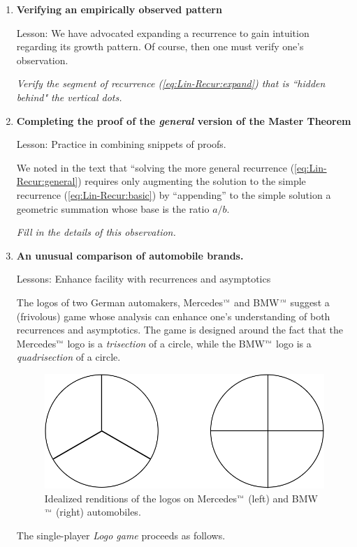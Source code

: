\begin{enumerate}
\item
{\bf Verifying an empirically observed pattern}

{\sc Lesson:} We have advocated expanding a recurrence to gain intuition regarding its growth pattern.  Of course, then one must verify one's observation.

\smallskip

{\em Verify the segment of recurrence (\ref{eq:Lin-Recur:expand}) that is ``hidden behind" the vertical dots.} 

\medskip\item
{\bf Completing the proof of the {\em general} version of the Master Theorem}

{\sc Lesson:} Practice in combining snippets of proofs.

\smallskip

We noted in the text that ``solving the more general recurrence (\ref{eq:Lin-Recur:general}) requires only augmenting the solution to the simple recurrence (\ref{eq:Lin-Recur:basic}) by ``appending'' to the simple solution a geometric summation whose base is the ratio $a/b$.

{\em Fill in the details of this observation.}

\medskip\item
{\bf An unusual comparison of automobile brands.}

{\sc Lessons:} Enhance facility with recurrences and asymptotics

\smallskip

The logos of two German automakers, {\sc Mercedes}$^{\mbox{\tiny\sc tm}}$ and BMW$^{\mbox{\tiny\sc tm}}$ suggest a (frivolous) game whose analysis can enhance one's understanding of both recurrences and asymptotics.  The game is designed around the fact that the {\sc Mercedes}$^{\mbox{\tiny\sc tm}}$ logo is a {\em trisection} of a circle, while the BMW$^{\mbox{\tiny\sc tm}}$ logo is a {\em quadrisection} of a circle.  
\begin{figure}[htb]
\begin{center}
        \includegraphics[scale=0.3]{FiguresMaths/AutomotiveBrands.png}
\end{center}
\caption{Idealized renditions of the logos on {\sc Mercedes}$^{\mbox{\tiny\sc tm}}$ (left) and BMW$^{\mbox{\tiny\sc tm}}$ (right) automobiles.}
\label{fig:auto-logos}
\end{figure}
The single-player {\it Logo game} proceeds as follows.  


\end{enumerate}
